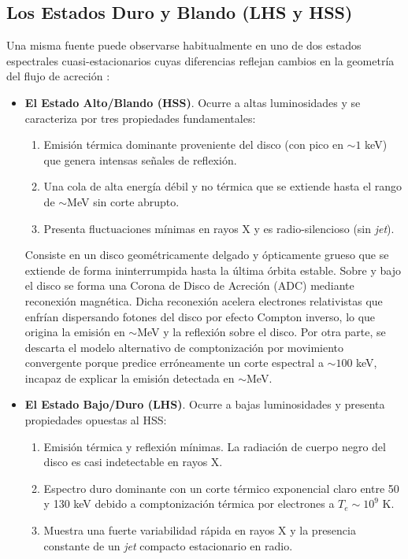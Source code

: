 \subsection{Los Estados Duro y Blando (LHS y HSS)}

\noindent Una misma fuente puede observarse habitualmente en uno de dos estados espectrales cuasi-estacionarios cuyas diferencias reflejan cambios en la geometría del flujo de acreción \cite{malzac}:

\begin{itemize}
    \item[$\bullet$] \textbf{El Estado Alto/Blando (HSS)}. Ocurre a altas luminosidades y se caracteriza por tres propiedades fundamentales:
    \begin{enumerate}
        \item Emisión térmica dominante proveniente del disco (con pico en $\sim 1$ keV) que genera intensas señales de reflexión.
        \item Una cola de alta energía débil y no térmica que se extiende hasta el rango de $\sim$MeV sin corte abrupto.
        \item Presenta fluctuaciones mínimas en rayos X y es radio-silencioso (sin \textit{jet}).
    \end{enumerate}
    Consiste en un disco geométricamente delgado y ópticamente grueso que se extiende de forma ininterrumpida hasta la última órbita estable. Sobre y bajo el disco se forma una Corona de Disco de Acreción (ADC) mediante reconexión magnética. Dicha reconexión acelera electrones relativistas que enfrían dispersando fotones del disco por efecto Compton inverso, lo que origina la emisión en $\sim$MeV y la reflexión sobre el disco. Por otra parte, se descarta el modelo alternativo de comptonización por movimiento convergente porque predice erróneamente un corte espectral a $\sim 100$ keV, incapaz de explicar la emisión detectada en $\sim$MeV.
    \item[$\bullet$] \textbf{El Estado Bajo/Duro (LHS)}. Ocurre a bajas luminosidades y presenta propiedades opuestas al HSS:
    \begin{enumerate}
        \item Emisión térmica y reflexión mínimas. La radiación de cuerpo negro del disco es casi indetectable en rayos X.
        \item Espectro duro dominante con un corte térmico exponencial claro entre 50 y 130 keV debido a comptonización térmica por electrones a $T_e\sim10^9$ K.
        \item Muestra una fuerte variabilidad rápida en rayos X y la presencia constante de un \textit{jet} compacto estacionario en radio.

\end{enumerate}
\end{itemize}
